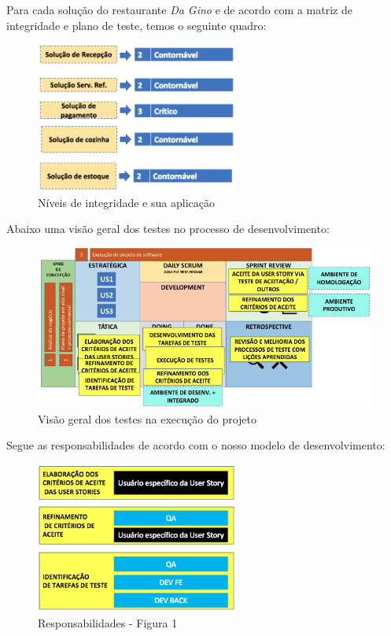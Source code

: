 Para cada solução do restaurante \textit{Da Gino} e de acordo com a matriz de integridade e plano de teste, temos o seguinte quadro:

\begin{figure}[H]
  \centering
  \includegraphics[width=0.6\textwidth]{softwareengineer/images/da-gino-integrity-level} 
  \caption{Níveis de integridade e sua aplicação}
  \label{fig:da-gino-integrity-level} 
\end{figure}

Abaixo uma visão geral dos testes no processo de desenvolvimento:

\begin{figure}[H]
  \centering
  \includegraphics[width=1\textwidth]{softwareengineer/images/model-cycle-tests} 
  \caption{Visão geral dos testes na execução do projeto}
  \label{fig:model-cycle-tests} 
\end{figure}

Segue as responsabilidades de acordo com o nosso modelo de desenvolvimento:

\begin{figure}[H]
  \centering
  \includegraphics[width=0.6\textwidth]{softwareengineer/images/responsibilities-1} 
  \caption{Responsabilidades - Figura 1}
  \label{fig:responsibilities-1} 
\end{figure}

